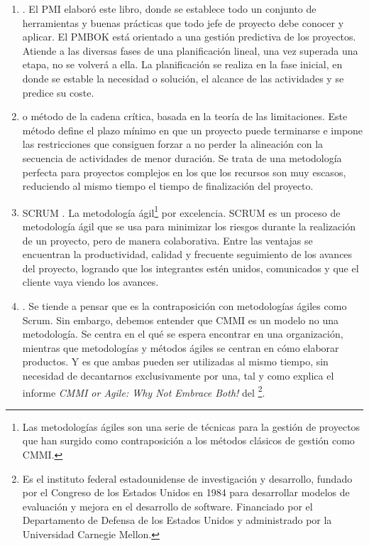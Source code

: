 \begin{enumerate}
\item {} \cite{PMBOK}. El \ac{PMI} elaboró este libro, donde se establece todo un conjunto de herramientas y buenas prácticas que todo jefe de proyecto debe conocer y aplicar. El \ac{PMBOK} está orientado a una gestión predictiva de los proyectos. Atiende a las diversas fases de una planificación lineal, una vez superada una etapa, no se volverá a ella. La planificación se realiza en la fase inicial, en donde se estable la necesidad o solución, el alcance de las actividades y se predice su coste.

\item {} \cite{CCPM} o método de la cadena crítica, basada en la teoría de las limitaciones. Este método define el plazo mínimo en que un proyecto puede terminarse e impone las restricciones que consiguen forzar a no perder la alineación con la secuencia de actividades de menor duración. Se trata de una metodología perfecta para proyectos complejos en los que los recursos son muy escasos, reduciendo al mismo tiempo el tiempo de finalización del proyecto.

\item SCRUM \cite {Scrum}. La metodología ágil\footnote{Las metodologías ágiles son una serie de técnicas para la gestión de proyectos que han surgido como contraposición a los métodos clásicos de gestión como CMMI.} por excelencia. SCRUM es un proceso de metodología ágil que se usa para minimizar los riesgos durante la realización de un proyecto, pero de manera colaborativa. Entre las ventajas se encuentran la productividad, calidad y frecuente seguimiento de los avances del proyecto, logrando que los integrantes estén unidos, comunicados y que el cliente vaya viendo los avances.

\item  {} \cite{CMMI}. Se tiende a pensar que es la contraposición con metodologías ágiles como Scrum. Sin embargo, debemos entender que \ac{CMMI} es un modelo no una metodología. Se centra en el qué se espera encontrar en una organización, mientras que metodologías y métodos ágiles se centran en cómo elaborar productos. Y es que ambas pueden ser utilizadas al mismo tiempo, sin necesidad de decantarnos exclusivamente por una, tal y como explica el informe \emph{CMMI or Agile: Why Not Embrace Both!} \cite{Whynot} del \footnote{Es el instituto federal estadounidense de investigación y desarrollo, fundado por el Congreso de los Estados Unidos en 1984 para desarrollar modelos de evaluación y mejora en el desarrollo de software. Financiado por el Departamento de Defensa de los Estados Unidos y administrado por la Universidad Carnegie Mellon.}.


\end{enumerate}
